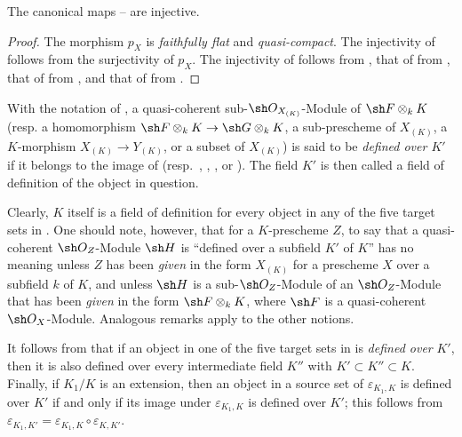 
\begin{proposition}[4.8.3]
\label{IV.4.8.3}
The canonical maps -- are
injective.
\end{proposition}

\begin{proof}
The morphism $p_X$ is \emph{faithfully flat} and \emph{quasi-compact}.
The injectivity of  follows from the surjectivity of
$p_X$.
The injectivity of  follows from
, that of  from
, that of  from
, and that of  from
.
\end{proof}

\begin{definition}[4.8.4]
\label{IV.4.8.4}
With the notation of , a quasi-coherent
sub-$\sh O_{X_{(K)}}$-Module of $\sh F\otimes_kK$
\textup{(resp.} a homomorphism
$\sh F\otimes_kK\to\sh G\otimes_kK$, a sub-prescheme of $X_{(K)}$,
a $K$-morphism $X_{(K)}\to Y_{(K)}$, or a subset of $X_{(K)}$\textup{)}
is said to be \emph{defined over $K'$} if it belongs to the image of
(resp.\ , ,
, or ).
The field $K'$ is then called a field of definition of the
object in question.
\end{definition}

Clearly, $K$ itself is a field of definition for every object in any
of the five target sets in .
One should note, however, that for a $K$-prescheme $Z$, to say that a
quasi-coherent $\sh O_Z$-Module $\sh H$ is ``defined over a subfield
$K'$ of $K$'' has no meaning unless $Z$ has been \emph{given} in the
form $X_{(K)}$ for a prescheme $X$ over a subfield $k$ of $K$, and
unless $\sh H$ is a sub-$\sh O_Z$-Module of an $\sh O_Z$-Module that
has been \emph{given} in the form $\sh F\otimes_kK$, where $\sh F$ is
a quasi-coherent $\sh O_X$-Module.
Analogous remarks apply to the other notions.

It follows from  that if an object in one of the
five target sets in  is \emph{defined over} $K'$, then it is
also defined over every intermediate field $K''$ with
$K'\subset K''\subset K$.
Finally, if $K_1/K$ is an extension, then an object in a source set
of $\varepsilon_{K_1,K}$ is defined over $K'$ if and only if its image under
$\varepsilon_{K_1,K}$ is defined over $K'$; this follows from $\varepsilon_{K_1,K'}=\varepsilon_{K_1,K}\circ\varepsilon_{K,K'}$.

